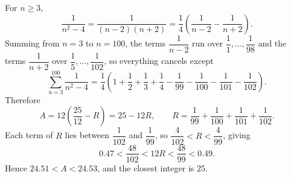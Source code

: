 For $n\ge3$,
\[\dfrac{1}{n^2-4}=\dfrac{1}{(n-2)(n+2)}=\dfrac{1}{4}\left(\dfrac{1}{n-2}-\dfrac{1}{n+2}\right).\]
Summing from $n=3$ to $n=100$, the terms $\dfrac{1}{n-2}$ run over $\dfrac{1}{1},\dots,\dfrac{1}{98}$ and the terms $\dfrac{1}{n+2}$ over $\dfrac{1}{5},\dots,\dfrac{1}{102}$, so everything cancels except
\[\sum_{n=3}^{100}\dfrac{1}{n^2-4}=\dfrac{1}{4}\left(1+\dfrac{1}{2}+\dfrac{1}{3}+\dfrac{1}{4}-\dfrac{1}{99}-\dfrac{1}{100}-\dfrac{1}{101}-\dfrac{1}{102}\right).\]
Therefore
\[A=12\left(\dfrac{25}{12}-R\right)=25-12R,\qquad R=\dfrac{1}{99}+\dfrac{1}{100}+\dfrac{1}{101}+\dfrac{1}{102}.\]
Each term of $R$ lies between $\dfrac{1}{102}$ and $\dfrac{1}{99}$, so $\dfrac{4}{102}<R<\dfrac{4}{99}$, giving
\[0.47<\dfrac{48}{102}<12R<\dfrac{48}{99}<0.49.\]
Hence $24.51<A<24.53$, and the closest integer is $\boxed{25}$.
